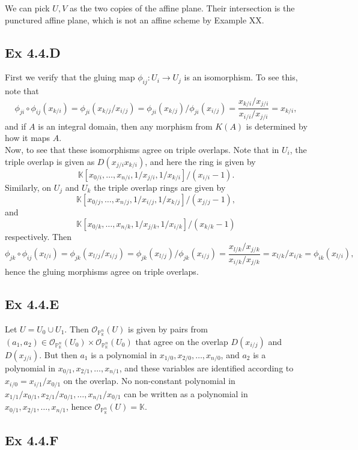\documentclass{article}
\theoremstyle{definition}
\newcommand{\K}{\mathbb{K}}
\renewcommand{\P}{\mathbb{P}}
\newcommand{\oo}{\mathcal{O}}
\newcommand{\oop}[2]{\oo_{\P^{#1}_{#2}}}
\begin{document}
We can pick $U, V$ as the two copies of the affine plane. Their intersection is
the punctured affine plane, which is not an affine scheme by Example XX.

\subsection*{Ex 4.4.D}

First we verify that the gluing map $\phi_{ij} : U_i \to U_j$ is an isomorphism.
To see this, note that
\[
	\phi_{ji} \circ \phi_{ij} (x_{k/i})
	=
	\phi_{ji}(x_{k/j}/x_{i/j})
	=
	\phi_{ji}(x_{k/j})/\phi_{ji}(x_{i/j})
	=
	\frac{x_{k/i}/x_{j/i}}{x_{i/i}/x_{j/i}}
	=
	x_{k/i},
\]
and if $A$ is an integral domain, then any morphism from $K(A)$ is determined
by how it maps $A$. \\

Now, to see that these isomorphisms agree on triple overlaps. Note that
in $U_i$, the triple overlap is given as $D(x_{j/i}x_{k/i})$,
and here the ring is given by
\[
	\K[x_{0/i}, \ldots, x_{n/i}, 1/x_{j/i}, 1/x_{k/i}]/(x_{i/i} - 1).
\]
Similarly, on $U_j$ and $U_k$ the triple overlap rings are given by
\[
	\K[x_{0/j}, \ldots, x_{n/j}, 1/x_{i/j}, 1/x_{k/j}]/(x_{j/j} - 1),
\]
and
\[
	\K[x_{0/k}, \ldots, x_{n/k}, 1/x_{j/k}, 1/x_{i/k}]/(x_{k/k} - 1)
\]
respectively. Then
\[
	\phi_{jk} \circ \phi_{ij} (x_{l/i})
	=
	\phi_{jk}(x_{l/j}/x_{i/j})
	=
	\phi_{jk}(x_{l/j})/\phi_{jk}(x_{i/j})
	=
	\frac{x_{l/k}/x_{j/k}}{x_{i/k}/x_{j/k}}
	=
	x_{l/k}/x_{i/k}
	=
	\phi_{ik}(x_{l/i}),
\]
hence the gluing morphisms agree on triple overlaps.

\subsection*{Ex 4.4.E}

Let $U = U_0 \cup U_1$. Then $\oop{n}{\K}(U)$ is given by pairs from $(a_1,
	a_2) \in \oop{n}{\K}(U_0) \times \oop{n}{\K}(U_0)$ that agree on the overlap
$D(x_{i/j})$ and $D(x_{j/i})$. But then $a_1$ is a polynomial in
$x_{1/0}, x_{2/0}, \ldots, x_{n/0}$, and $a_2$ is a polynomial in
$x_{0/1}, x_{2/1}, \ldots, x_{n/1}$, and these variables are identified
according to $x_{i/0} = x_{i/1}/x_{0/1}$ on the overlap. No non-constant
polynomial in $x_{1/1}/x_{0/1}, x_{2/1}/x_{0/1}, \ldots, x_{n/1}/x_{0/1}$
can be written as a polynomial in $x_{0/1}, x_{2/1}, \ldots, x_{n/1}$,
hence $\oop{n}{\K}(U) = \K$.

\subsection*{Ex 4.4.F}
\end{document}
